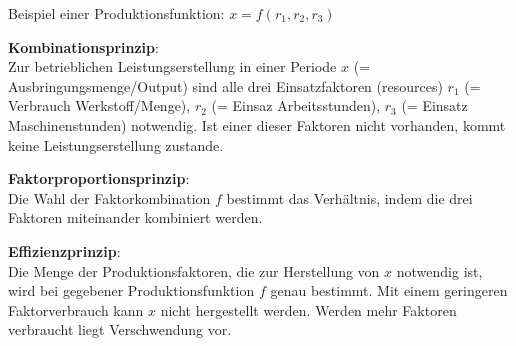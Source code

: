 \documentclass[11pt]{article}
\begin{document}
Beispiel einer Produktionsfunktion: \(x=f(r_1, r_2, r_3)\)

\textbf{Kombinationsprinzip}:\\
Zur betrieblichen Leistungserstellung in einer Periode \(x\) (= Ausbringungsmenge/Output) sind alle drei Einsatzfaktoren (resources) \(r_1\) (= Verbrauch Werkstoff/Menge), \(r_2\) (= Einsaz Arbeitsstunden), \(r_3\) (= Einsatz Maschinenstunden) notwendig. Ist einer dieser Faktoren nicht vorhanden, kommt keine Leistungserstellung zustande.

\textbf{Faktorproportionsprinzip}:\\
Die Wahl der Faktorkombination \(f\) bestimmt das Verhältnis, indem die drei Faktoren miteinander kombiniert werden.

\textbf{Effizienzprinzip}:\\
Die Menge der Produktionsfaktoren, die zur Herstellung von \(x\) notwendig ist, wird bei gegebener Produktionsfunktion \(f\) genau bestimmt. Mit einem geringeren Faktorverbrauch kann \(x\) nicht hergestellt werden. Werden mehr Faktoren verbraucht liegt Verschwendung vor.
\end{document}

